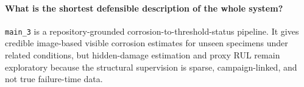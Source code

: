 \documentclass[11pt,a4paper]{article}
\begin{document}
\paragraph{What is the shortest defensible description of the whole system?}
\texttt{main\_3} is a repository-grounded corrosion-to-threshold-status pipeline. It gives credible image-based visible corrosion estimates for unseen specimens under related conditions, but hidden-damage estimation and proxy RUL remain exploratory because the structural supervision is sparse, campaign-linked, and not true failure-time data.
\end{document}
